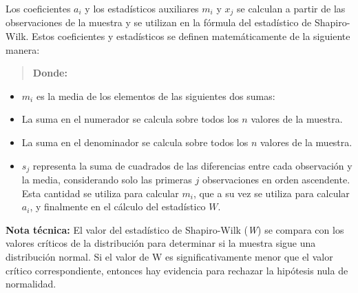 \documentclass[
  10pt,
  letterpaper,
  DIV=11,
  numbers=noendperiod]{scrreprt}
\providecommand{\tightlist}{%
  \setlength{\itemsep}{0pt}\setlength{\parskip}{0pt}}\usepackage{longtable,booktabs,array}
\begin{document}
Los coeficientes \(a_{i}\) y los estadísticos auxiliares \(m_{i}\) y
\(x_{j}\) se calculan a partir de las observaciones de la muestra y se
utilizan en la fórmula del estadístico de Shapiro-Wilk. Estos
coeficientes y estadísticos se definen matemáticamente de la siguiente
manera:

\begin{quote}
\textbf{Donde:}
\end{quote}

\begin{itemize}
\tightlist
\item
  \(m_{i}\) es la media de los elementos de las siguientes dos sumas:
\item
  La suma en el numerador se calcula sobre todos los \(n\) valores de la
  muestra.
\item
  La suma en el denominador se calcula sobre todos los \(n\) valores de
  la muestra.
\item
  \(s_{j}\) representa la suma de cuadrados de las diferencias entre
  cada observación y la media, considerando solo las primeras \(j\)
  observaciones en orden ascendente. Esta cantidad se utiliza para
  calcular \(m_{i}\), que a su vez se utiliza para calcular \(a_{i}\), y
  finalmente en el cálculo del estadístico \(W\).
\end{itemize}

\textbf{Nota técnica:} El valor del estadístico de Shapiro-Wilk
(\emph{W}) se compara con los valores críticos de la distribución para
determinar si la muestra sigue una distribución normal. Si el valor de W
es significativamente menor que el valor crítico correspondiente,
entonces hay evidencia para rechazar la hipótesis nula de normalidad.
\end{document}
